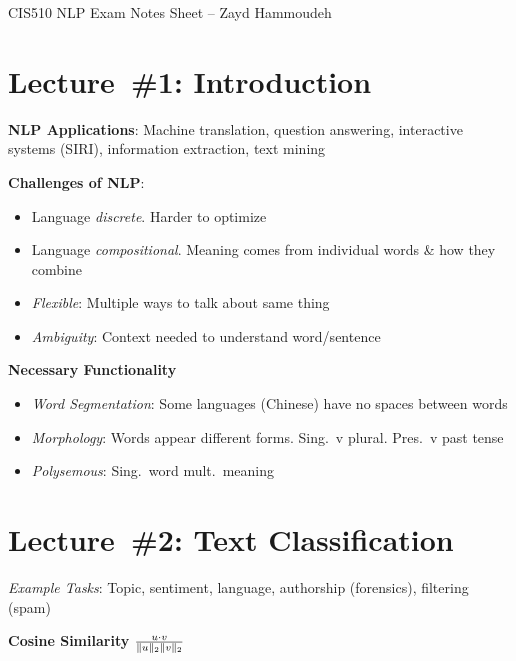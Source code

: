 \documentclass[9pt]{extarticle}
\renewcommand{\green}[1]{{\color{ForestGreen} #1}}
\newcommand{\greenbf}[1]{\textbf{\green{#1}}}
\begin{document}
\setlength{\abovedisplayskip}{0pt}
\setlength{\belowdisplayskip}{0pt}

\begin{center}
CIS510 NLP Exam Notes Sheet -- Zayd Hammoudeh
\end{center}
\begin{multicols}{3}
  \section*{Lecture~\#1: Introduction}

  \textbf{NLP Applications}: Machine translation, question answering, interactive systems (SIRI), information extraction, text mining

  \textbf{Challenges of NLP}:
  \begin{itemize}
    \item Language \textit{discrete}. Harder to optimize
    \item Language \textit{compositional}. Meaning comes from individual words \& how they combine
    \item \textit{Flexible}: Multiple ways to talk about same thing
    \item \textit{Ambiguity}: Context needed to understand word/sentence
  \end{itemize}

  \textbf{Necessary Functionality}
  \begin{itemize}
    \item \textit{Word Segmentation}: Some languages (Chinese) have no spaces between words
    \item \textit{Morphology}: Words appear different forms. Sing.\ v plural. Pres.\ v past tense
    \item \textit{Polysemous}: Sing.\ word mult.\ meaning
  \end{itemize}

  \section*{Lecture~\#2: Text Classification}
  \textit{Example Tasks}: Topic, sentiment, language, authorship (forensics), filtering (spam)

  \greenbf{Cosine Similarity} $\frac{u \cdot v}{\lVert u\rVert_{2} \lVert v\rVert_{2}}$

  \subsection*{}


\end{multicols}
\end{document}

